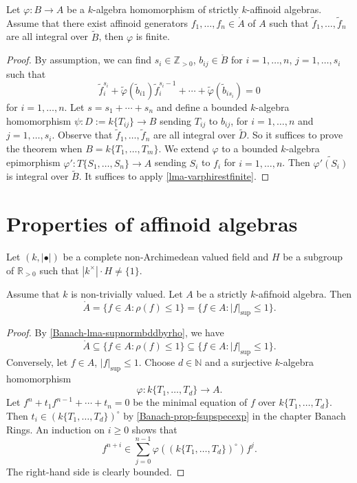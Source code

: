 \begin{lemma}\label{lma-reductionfiniteimplyfinite}
    Let $\varphi:B\rightarrow A$ be a $k$-algebra homomorphism of strictly $k$-affinoid algebras. Assume that there exist affinoid generators $f_1,\ldots,f_n\in \mathring{A}$ of $A$ such that $\tilde{f}_1,\ldots,\tilde{f}_n$ are all integral over $\tilde{B}$, then $\varphi$ is finite.
\end{lemma}
\begin{proof}
    By assumption, we can find $s_i\in \mathbb{Z}_{>0}$, $b_{ij}\in \mathring{B}$ for $i=1,\ldots,n$, $j=1,\ldots,s_i$ such that
    \[
        \tilde{f}_i^{s_i}+\tilde{\varphi}(\tilde{b}_{i1}) \tilde{f}_i^{s_i-1}+\cdots+\tilde{\varphi}(\tilde{b}_{is_i})=0 
    \]
    for $i=1,\ldots,n$. Let $s=s_1+\cdots+s_n$ and define a bounded $k$-algebra homomorphism $\psi:D:=k\{T_{ij}\}\rightarrow B$ sending $T_{ij}$ to $b_{ij}$, for $i=1,\ldots,n$ and $j=1,\ldots,s_i$. Observe that $\tilde{f}_1,\ldots,\tilde{f}_n$ are all integral over $\tilde{D}$. So it suffices to prove the theorem when $B=k\{T_1,\ldots,T_m\}$. We extend $\varphi$ to a bounded $k$-algebra epimorphism $\varphi':T\{S_1,\ldots,S_n\}\rightarrow A$ sending $S_i$ to $f_i$ for $i=1,\ldots,n$.  Then $\tilde{\varphi'(S_i)}$ is integral over $\tilde{B}$. It suffices to apply \cref{lma-varphirestfinite}.
\end{proof}

\section{Properties of affinoid algebras}
Let $(k,|\bullet|)$ be a complete non-Archimedean valued field and $H$ be a subgroup of $\mathbb{R}_{>0}$ such that $|k^{\times}|\cdot H\neq \{1\}$.

\begin{proposition}\label{prop-powerbddinstrictlyaff}
    Assume that $k$ is non-trivially valued. Let $A$ be a strictly $k$-afifnoid algebra. Then
    \[
        \mathring{A}=\{f\in A: \rho(f)\leq 1\}=\{f\in A: |f|_{\sup}\leq 1\}.    
    \]
\end{proposition}
\begin{proof}
    By \cref{Banach-lma-supnormbddbyrho}, we have 
    \[
        \mathring{A}\subseteq \{f\in A: \rho(f)\leq 1\}\subseteq \{f\in A: |f|_{\sup}\leq 1\}. 
    \]
    Conversely, let $f\in A$, $|f|_{\sup}\leq 1$. Choose $d\in \mathbb{N}$ and a surjective $k$-algebra homomorphism
    \[
        \varphi:k\{T_1,\ldots,T_d\}\rightarrow A.  
    \]
    Let $f^n+t_1f^{n-1}+\cdots+t_n=0$ be the minimal equation of $f$ over $k\{T_1,\ldots,T_d\}$. Then $t_i\in (k\{T_1,\ldots,T_d\})^{\circ}$ by \cref{Banach-prop-fsupspecexp} in the chapter Banach Rings. An induction on $i\geq 0$ shows that
    \[
        f^{n+i}\in \sum_{j=0}^{n-1}\varphi\left((k\{T_1,\ldots,T_d\})^{\circ} \right)f^j.
    \]
    The right-hand side is clearly bounded.
\end{proof}



